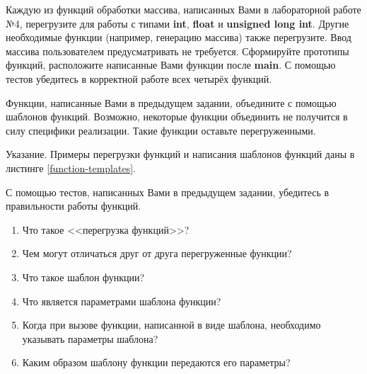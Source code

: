 
\labtask

Каждую из функций обработки массива, написанных Вами в лабораторной работе №4, перегрузите для работы с типами \textbf{int}, \textbf{float} и \textbf{unsigned long int}.
Другие необходимые функции (например, генерацию массива) также перегрузите.
Ввод массива пользователем предусматривать не требуется.
Сформируйте прототипы функций, расположите написанные Вами функции после \textbf{main}.
С помощью тестов убедитесь в корректной работе всех четырёх функций.


\labtask

Функции, написанные Вами в предыдущем задании, объедините с помощью шаблонов функций.
Возможно, некоторые функции объединить не получится в силу специфики реализации.
Такие функции оставьте перегруженными.

Указание. Примеры перегрузки функций и написания шаблонов функций даны в листинге \ref{function-templates}.

С помощью тестов, написанных Вами в предыдущем задании, убедитесь в правильности работы функций.


\labworkquestions
\begin{enumerate}
	\item
		Что такое <<перегрузка функций>>?
	\item
		Чем могут отличаться друг от друга перегруженные функции?
	\item
		Что такое шаблон функции?
	\item
		Что является параметрами шаблона функции?
	\item
		Когда при вызове функции, написанной в виде шаблона, необходимо указывать параметры шаблона?
	\item
		Каким образом шаблону функции передаются его параметры?
\end{enumerate}

